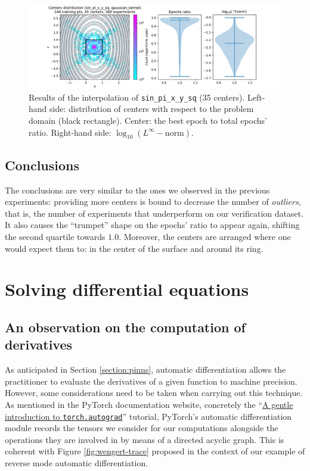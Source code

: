 \documentclass[12pt]{report} %
\begin{document}
\begin{figure}[H]
  \includegraphics[width=\textwidth, trim={2cm 0 2.8cm 0}, clip=true]{imagenes/experiments/2d/sin_pi_x_y_sq_interpolation/tr12_c35_sin_pi_x_y_sq_gaussian_kernel.pdf}
  \caption{Results of the interpolation of \texttt{sin\_pi\_x\_y\_sq} (35 centers).
    Left-hand side: distribution of centers with respect to the problem domain (black rectangle). Center: the best epoch to total epochs' ratio.
    Right-hand side: $\log_{10}(L^\infty-\text{norm})$.}
  \label{fig:sin-pi-x-y-sq-tr12-c35}
\end{figure}

\subsection*{Conclusions}

The conclusions are very similar to the ones we observed in the previous experiments: providing
more centers is bound to decrease the number of \textit{outliers}, that is, the number of
experiments that underperform on our verification dataset. It also causes the
``trumpet'' shape on the epochs' ratio to appear again, shifting the second quartile towards
$1.0$. Moreover, the centers are arranged
where one would expect them to: in the center of the surface and around its ring.

\clearpage
\section{Solving differential equations}

\subsection{An observation on the computation of derivatives}

As anticipated in Section \ref{section:pinns}, automatic differentiation allows the
practitioner to evaluate the derivatives of a given function to machine precision.
However, some considerations need to be taken when carrying out this technique.
As mentioned in the PyTorch documentation website, concretely the
``\href{https://pytorch.org/tutorials/beginner/blitz/autograd_tutorial.html}{A gentle
  introduction to \texttt{torch.autograd}}'' tutorial, PyTorch's automatic differentiation
module records the tensors we consider for our computations alongside the operations
they are involved in by means of a directed acyclic graph. This is coherent with
Figure \ref{fig:wengert-trace} proposed in the context of our example of reverse
mode automatic differentiation.
\end{document}
